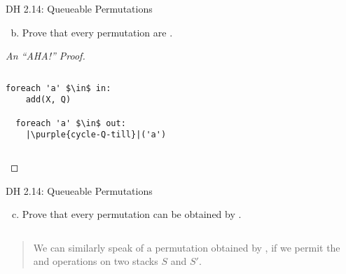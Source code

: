 \begin{frame}[fragile]{}
  \begin{exampleblock}{DH 2.14: Queueable Permutations}
    \begin{enumerate}[(a)]
      \setcounter{enumi}{1}
      \item Prove that every permutation are .
    \end{enumerate}
  \end{exampleblock}

  \begin{proof}[An ``AHA!'' Proof]
    \begin{columns}
	\begin{lstlisting}[style = Cstyle]
  foreach 'a' $\in$ in:
    add(X, Q)

  foreach 'a' $\in$ out:
    |\purple{cycle-Q-till}|('a')
        \end{lstlisting}
      \pause
    \end{columns}
  \end{proof}
\end{frame}

\begin{frame}{}
  \begin{exampleblock}{DH 2.14: Queueable Permutations}
    \begin{enumerate}[(a)]
      \setcounter{enumi}{2}
      \item Prove that every permutation can be obtained by .
    \end{enumerate}
  \end{exampleblock}

  \pause
  \vspace{0.30cm}
  \begin{columns}[b]
  \end{columns}

  \pause
  \vspace{0.30cm}
  \begin{quote}
    We can similarly speak of a permutation obtained by ,
    if we permit the  and  operations 
    on two stacks $S$ and $S'$.
  \end{quote}
\end{frame}

